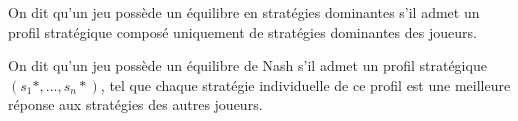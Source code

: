 \begin{definition}[Équilibre]
	On dit qu’un jeu possède un équilibre en stratégies dominantes s’il admet un profil stratégique composé uniquement de stratégies dominantes des joueurs.
\end{definition}

\begin{definition}
On dit qu’un jeu possède un équilibre de Nash s’il admet un profil stratégique $(s_1*, …,s_n*)$, tel que chaque stratégie individuelle de ce profil est une meilleure réponse aux stratégies des autres joueurs.
\end{definition}